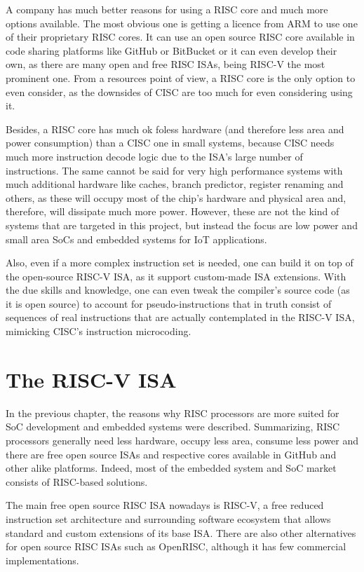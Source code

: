 A company has much better reasons for using a RISC core and much more options
available. The most obvious one is getting a licence from ARM to use one of
their proprietary RISC cores. It can use an open source RISC core available in
code sharing platforms like GitHub or BitBucket or it can even develop their
own, as there are many open and free RISC ISAs, being RISC-V the most prominent
one. From a resources point of view, a RISC core is the only option to even
consider, as the downsides of CISC are too much for even considering using it.

Besides, a RISC core has much ok foless hardware (and therefore less area and power
consumption) than a CISC one in small systems, because CISC needs much more
instruction decode logic due to the ISA's large number of instructions. The same
cannot be said for very high performance systems with much additional hardware
like caches, branch predictor, register renaming and others, as these will
occupy most of the chip's hardware and physical area and, therefore, will
dissipate much more power. However, these are not the kind of systems that are
targeted in this project, but instead the focus are low power and small area
SoCs and embedded systems for IoT applications.

Also, even if a more complex instruction set is needed, one can build it on top
of the open-source RISC-V ISA, as it support custom-made ISA extensions. With
the due skills and knowledge, one can even tweak the compiler's source code (as
it is open source) to account for pseudo-instructions that in truth consist of
sequences of real instructions that are actually contemplated in the RISC-V ISA,
mimicking CISC's instruction microcoding.





\section{The RISC-V ISA}
\label{section:riscvisa}

In the previous chapter, the reasons why RISC processors are more suited for SoC
development and embedded systems were described. Summarizing, RISC processors
generally need less hardware, occupy less area, consume less power and there are
free open source ISAs and respective cores available in GitHub and other alike
platforms. Indeed, most of the embedded system and SoC market consists of
RISC-based solutions.

The main free open source RISC ISA nowadays is RISC-V, a free reduced
instruction set architecture and surrounding software ecosystem that allows
standard and custom extensions of its base ISA. There are also other
alternatives for open source RISC ISAs such as OpenRISC, although it has few
commercial implementations.

